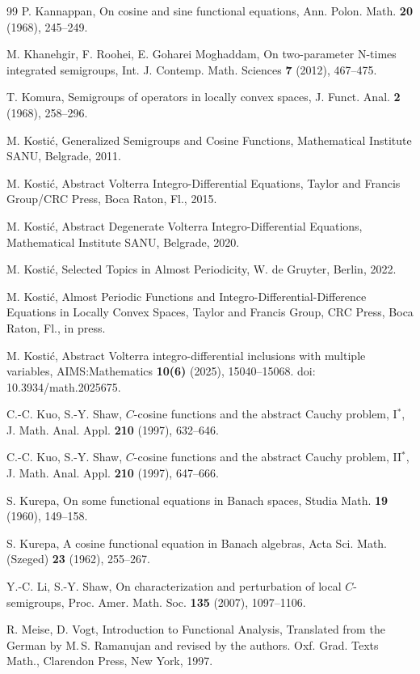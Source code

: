 \documentclass{amsart}
\theoremstyle{definition}
\theoremstyle{remark}
\numberwithin{equation}{section}
\begin{document}
\begin{thebibliography}{99}
P. Kannappan, 
On cosine and sine functional equations, 
Ann. Polon. Math. {\bf 20} (1968),
245--249.

M. Khanehgir, F. Roohei, E. Goharei Moghaddam, 
On two-parameter N-times integrated semigroups,
Int. J. Contemp. Math. Sciences {\bf 7} (2012), 467--475.

T. Komura, 
Semigroups of operators in locally convex spaces,
J. Funct. Anal. {\bf 2} (1968), 258--296.

M. Kosti\' c,
Generalized Semigroups and Cosine Functions,
Mathematical Institute SANU, Belgrade, 2011.

M. Kosti\' c,
Abstract Volterra Integro-Differential Equations,
Taylor and Francis Group/CRC Press, Boca Raton, Fl., 2015.

M. Kosti\' c,
Abstract Degenerate Volterra Integro-Differential Equations,
Mathematical Institute SANU, Belgrade, 2020.

M. Kosti\'c, 
Selected Topics in Almost Periodicity,
W. de Gruyter, Berlin, 2022.

M. Kosti\'c,
Almost Periodic Functions and Integro-Differential-Difference Equations in Locally Convex Spaces,
Taylor and Francis Group, CRC Press, Boca Raton, Fl., in press.

M. Kosti\'c,
Abstract Volterra integro-differential inclusions with multiple variables,
AIMS:Mathematics {\bf 10(6)} (2025), 15040--15068. doi: 10.3934/math.2025675.

C.-C. Kuo, S.-Y. Shaw,
$C$-cosine functions and the abstract Cauchy problem, I$^*$,
J. Math. Anal. Appl. \textbf{210} (1997), 632--646.

C.-C. Kuo, S.-Y. Shaw,
$C$-cosine functions and the abstract Cauchy problem, II$^*$,
J. Math. Anal. Appl. \textbf{210} (1997), 647--666.

S. Kurepa, 
On some functional equations in Banach spaces, 
Studia Math. {\bf 19} (1960), 149--158.

S. Kurepa, 
A cosine functional equation in Banach algebras, 
Acta Sci. Math. (Szeged) {\bf 23} (1962), 255--267.

Y.-C. Li, S.-Y. Shaw,
On characterization and perturbation of local $C$-semigroups,
Proc. Amer. Math. Soc. {\bf 135} (2007), 1097--1106.

R. Meise, D. Vogt,
Introduction to Functional Analysis,
Translated from the German by M.\,S. Ramanujan and revised by the authors.
Oxf. Grad. Texts Math., Clarendon Press, New York, 1997.


\end{thebibliography}
\end{document}
